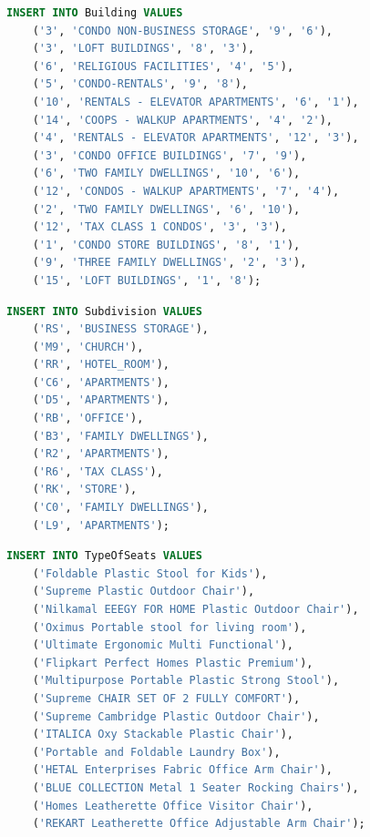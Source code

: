 \documentclass[a4paper,12pt]{article}
\begin{document}
	\begin{lstlisting}[language=SQL]
	INSERT INTO Building VALUES
	('3', 'CONDO NON-BUSINESS STORAGE', '9', '6'),
	('3', 'LOFT BUILDINGS', '8', '3'),
	('6', 'RELIGIOUS FACILITIES', '4', '5'),
	('5', 'CONDO-RENTALS', '9', '8'),
	('10', 'RENTALS - ELEVATOR APARTMENTS', '6', '1'),
	('14', 'COOPS - WALKUP APARTMENTS', '4', '2'),
	('4', 'RENTALS - ELEVATOR APARTMENTS', '12', '3'),
	('3', 'CONDO OFFICE BUILDINGS', '7', '9'),
	('6', 'TWO FAMILY DWELLINGS', '10', '6'),
	('12', 'CONDOS - WALKUP APARTMENTS', '7', '4'),
	('2', 'TWO FAMILY DWELLINGS', '6', '10'),
	('12', 'TAX CLASS 1 CONDOS', '3', '3'),
	('1', 'CONDO STORE BUILDINGS', '8', '1'),
	('9', 'THREE FAMILY DWELLINGS', '2', '3'),
	('15', 'LOFT BUILDINGS', '1', '8');
	\end{lstlisting}
	
	
	\begin{lstlisting}[language=SQL]
	INSERT INTO Subdivision VALUES
	('RS', 'BUSINESS STORAGE'),
	('M9', 'CHURCH'),
	('RR', 'HOTEL_ROOM'),
	('C6', 'APARTMENTS'),
	('D5', 'APARTMENTS'),
	('RB', 'OFFICE'),
	('B3', 'FAMILY DWELLINGS'),
	('R2', 'APARTMENTS'),
	('R6', 'TAX CLASS'),
	('RK', 'STORE'),
	('C0', 'FAMILY DWELLINGS'),
	('L9', 'APARTMENTS');
	\end{lstlisting}
	
\newpage
	
	\begin{lstlisting}[language=SQL]
	INSERT INTO TypeOfSeats VALUES
	('Foldable Plastic Stool for Kids'),
	('Supreme Plastic Outdoor Chair'),
	('Nilkamal EEEGY FOR HOME Plastic Outdoor Chair'),
	('Oximus Portable stool for living room'),
	('Ultimate Ergonomic Multi Functional'),
	('Flipkart Perfect Homes Plastic Premium'),
	('Multipurpose Portable Plastic Strong Stool'),
	('Supreme CHAIR SET OF 2 FULLY COMFORT'),
	('Supreme Cambridge Plastic Outdoor Chair'),
	('ITALICA Oxy Stackable Plastic Chair'),
	('Portable and Foldable Laundry Box'),
	('HETAL Enterprises Fabric Office Arm Chair'),
	('BLUE COLLECTION Metal 1 Seater Rocking Chairs'),
	('Homes Leatherette Office Visitor Chair'),
	('REKART Leatherette Office Adjustable Arm Chair');
	\end{lstlisting}
	
\end{document}
